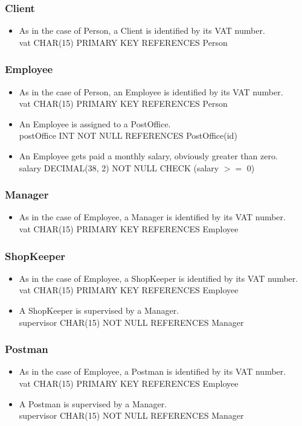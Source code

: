 \documentclass{report}[a4paper]
\theoremstyle{remark}
\begin{document}
\subsubsection{Client}
\begin{itemize}
    \item As in the case of Person, a Client is identified by its VAT number. \\ vat CHAR(15) PRIMARY KEY REFERENCES Person
\end{itemize}
\subsubsection{Employee}
\begin{itemize}
    \item As in the case of Person, an Employee is identified by its VAT number. \\ vat CHAR(15) PRIMARY KEY REFERENCES Person
    \item An Employee is assigned to a PostOffice. \\ postOffice INT NOT NULL REFERENCES PostOffice(id)
    \item An Employee gets paid a monthly salary, obviously greater than zero. \\ salary DECIMAL(38, 2) NOT NULL CHECK (salary $>=$ 0)
\end{itemize}
\subsubsection{Manager}
\begin{itemize}
    \item As in the case of Employee, a Manager is identified by its VAT number. \\ vat CHAR(15) PRIMARY KEY REFERENCES Employee
\end{itemize}
\subsubsection{ShopKeeper}
\begin{itemize}
    \item As in the case of Employee, a ShopKeeper is identified by its VAT number. \\ vat CHAR(15) PRIMARY KEY REFERENCES Employee
    \item A ShopKeeper is supervised by a Manager. \\ supervisor CHAR(15) NOT NULL REFERENCES Manager
\end{itemize}
\subsubsection{Postman}
\begin{itemize}
    \item As in the case of Employee, a Postman is identified by its VAT number. \\ vat CHAR(15) PRIMARY KEY REFERENCES Employee
    \item A Postman is supervised by a Manager. \\ supervisor CHAR(15) NOT NULL REFERENCES Manager
\end{itemize}
\end{document}
